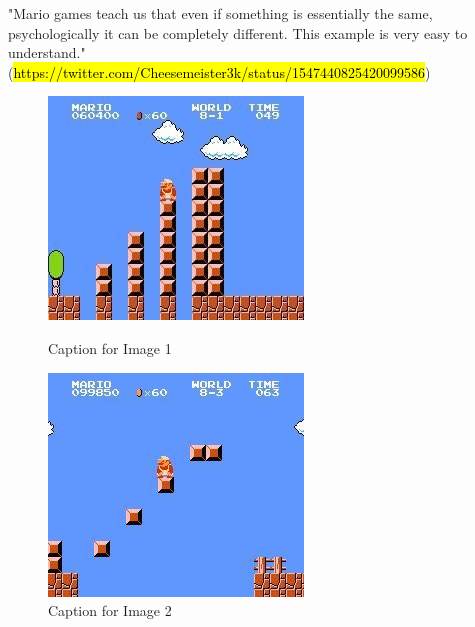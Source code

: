 \documentclass{article}
\begin{document}
"Mario games teach us that even if something is essentially the same, psychologically it can be completely different. This example is very easy to understand." (\hl{https://twitter.com/Cheesemeister3k/status/1547440825420099586})

\begin{figure}[h]
    \centering
    \begin{minipage}[b]{0.45\linewidth}
      \includegraphics[width=\linewidth]{Images/cheeseMeister3kMario1.jpg}
      \caption{Caption for Image 1}
      \label{fig:image1}
    \end{minipage}
    \hspace{0.5cm} %
    \begin{minipage}[b]{0.45\linewidth}
      \includegraphics[width=\linewidth]{Images/cheeseMeister3kMario2.jpg}
      \caption{Caption for Image 2}
      \label{fig:image2}
    \end{minipage}
  \end{figure}
\end{document}
